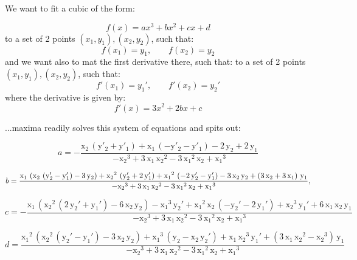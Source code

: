 We want to fit a cubic of the form:

\begin{equation}
 f(x) = a x^3 + bx^2 + cx +d
\end{equation}
to a set of 2 points $(x_1, y_1), (x_2, y_2)$, such that:
\begin{equation}
 f(x_1) = y_1, \qquad f(x_2) = y_2
\end{equation}
and we want also to mat the first derivative there, such that:
to a set of 2 points $(x_1, y_1), (x_2, y_2)$, such that:
\begin{equation}
 f'(x_1) = y_1', \qquad f'(x_2) = y_2'
\end{equation}
where the derivative is given by:
\begin{equation}
 f'(x) = 3 x^2 + 2 b x + c
\end{equation}

...maxima readily solves this system of equations and spits out:

\begin{equation}
 a=-\frac{\mathrm{x_2}\,\left(\mathrm{y'_2}+\mathrm{y'_1}\right)+\mathrm{x_1}\,\left(-\mathrm{y'_2}-\mathrm{y'_1}\right)-2\,\mathrm{y_2}+2\,\mathrm{y_1}}{-\mathrm{x_2}^3+3\,\mathrm{x_1}\,\mathrm{x_2}^2-3\,\mathrm{x_1}^2\,\mathrm{x_2}+\mathrm{x_1}^3}
\end{equation}

\begin{equation}
 b=\frac{\mathrm{x_1}\,\left(\mathrm{x_2}\,\left(\mathrm{y_2'}-\mathrm{y_1'}\right)-3\,\mathrm{y_2}\right)+\mathrm{x_2}^2\,\left(\mathrm{y_2'}+2\,\mathrm{y_1'}\right)+\mathrm{x_1}^2\,\left(-2\,\mathrm{y_2'}-\mathrm{y_1'}\right)-3\,\mathrm{x_2}\,\mathrm{y_2}+\left(3\,\mathrm{x_2}+3\,\mathrm{x_1}\right)\,\mathrm{y_1}}{-\mathrm{x_2}^3+3\,\mathrm{x_1}\,\mathrm{x_2}^2-3\,\mathrm{x_1}^2\,\mathrm{x_2}+\mathrm{x_1}^3} , \linebreak[0]
\end{equation}

\begin{equation}
c=-\frac{\mathrm{x_1}\,\left(\mathrm{x_2}^2\,\left(2\,\mathrm{y_2'}+\mathrm{y_1'}\right)-6\,\mathrm{x_2}\,\mathrm{y_2}\right)-\mathrm{x_1}^3\,\mathrm{y_2'}+\mathrm{x_1}^2\,\mathrm{x_2}\,\left(-\mathrm{y_2'}-2\,\mathrm{y_1'}\right)+\mathrm{x_2}^3\,\mathrm{y_1'}+6\,\mathrm{x_1}\,\mathrm{x_2}\,\mathrm{y_1}}{-\mathrm{x_2}^3+3\,\mathrm{x_1}\,\mathrm{x_2}^2-3\,\mathrm{x_1}^2\,\mathrm{x_2}+\mathrm{x_1}^3}  
\end{equation}

\begin{equation}
d=\frac{\mathrm{x_1}^2\,\left(\mathrm{x_2}^2\,\left(\mathrm{y_2'}-\mathrm{y_1'}\right)-3\,\mathrm{x_2}\,\mathrm{y_2}\right)+\mathrm{x_1}^3\,\left(\mathrm{y_2}-\mathrm{x_2}\,\mathrm{y_2'}\right)+\mathrm{x_1}\,\mathrm{x_2}^3\,\mathrm{y_1'}+\left(3\,\mathrm{x_1}\,\mathrm{x_2}^2-\mathrm{x_2}^3\right)\,\mathrm{y_1}}{-\mathrm{x_2}^3+3\,\mathrm{x_1}\,\mathrm{x_2}^2-3\,\mathrm{x_1}^2\,\mathrm{x_2}+\mathrm{x_1}^3}  
\end{equation}


